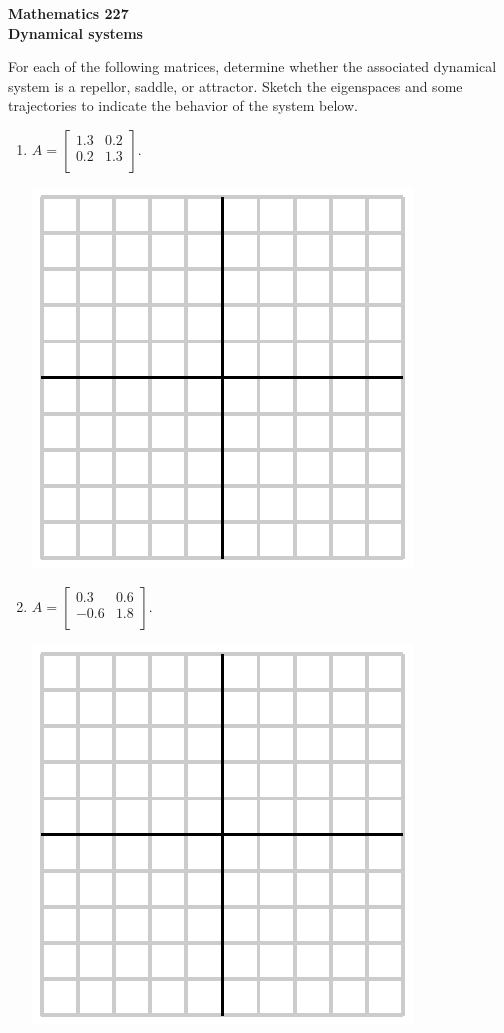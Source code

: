 \documentclass[12pt]{article}
\begin{document}
\noindent
{\bf Mathematics 227} \\ 
{\bf Dynamical systems}

\bigskip
For each of the following matrices, determine whether the associated
dynamical system is a repellor, saddle, or attractor.  Sketch the
eigenspaces and some trajectories to indicate the behavior of the
system below. 

\begin{enumerate}
\item
  $A =
  \left[
    \begin{array}{cc}
      1.3 & 0.2 \\
      0.2 & 1.3 \\
    \end{array}
  \right].
  $

  \includegraphics{empty.eps}


\item
  $A =
  \left[
    \begin{array}{cc}
      0.3 & 0.6 \\
      -0.6 & 1.8 \\
    \end{array}
  \right].
  $

  \includegraphics{empty.eps}
  

\end{enumerate}
\end{document}
